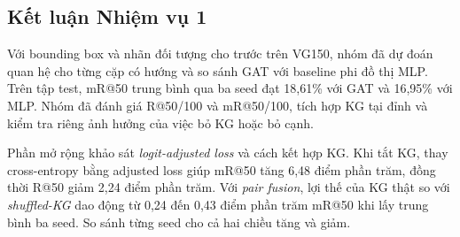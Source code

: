 \subsection{Kết luận Nhiệm vụ 1}
Với bounding box và nhãn đối tượng cho trước trên VG150, nhóm đã dự đoán
quan hệ cho từng cặp có hướng và so sánh GAT với baseline phi đồ thị MLP.
Trên tập test, mR@50 trung bình qua ba seed đạt 18,61\% với GAT và
16,95\% với MLP. Nhóm đã đánh giá R@50/100 và mR@50/100, tích hợp KG
tại đỉnh và kiểm tra riêng ảnh hưởng của việc bỏ KG hoặc bỏ cạnh.

Phần mở rộng khảo sát \textit{logit-adjusted loss} và cách kết hợp KG.
Khi tắt KG, thay cross-entropy bằng adjusted loss giúp mR@50 tăng
6,48 điểm phần trăm, đồng thời R@50 giảm 2,24 điểm phần trăm.
Với \textit{pair fusion}, lợi thế của KG thật so với \textit{shuffled-KG}
dao động từ 0,24 đến 0,43 điểm phần trăm mR@50 khi lấy trung bình ba seed. So sánh từng seed cho cả hai chiều tăng và giảm.
